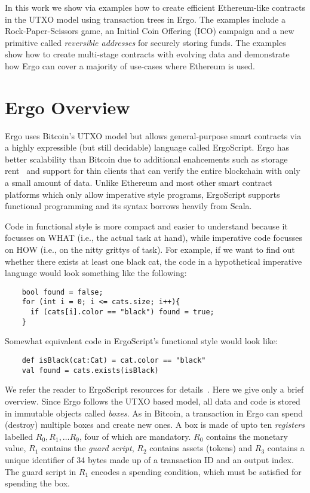 \documentclass[runningheads]{llncs}
\newcommand{\langname}{ErgoScript\xspace}
\begin{document}
In this work we show via examples how to create efficient Ethereum-like contracts in the UTXO model using transaction trees in Ergo. 
The examples include a Rock-Paper-Scissors game, an Initial Coin Offering (ICO) campaign and a new primitive called {\em reversible addresses} for securely storing funds. The examples show how to create multi-stage contracts with evolving data and demonstrate how Ergo can cover a majority of use-cases where Ethereum is used.  


\section{Ergo Overview}
\label{ergo-overview}

Ergo uses Bitcoin's UTXO model but allows general-purpose smart contracts via a highly expressible (but still decidable) language called \langname. Ergo has better scalability than Bitcoin due to additional enahcements such as storage rent~\cite{chepurnoy2018systematic} and support for thin clients that can verify the entire blockchain with only a small amount of data. Unlike Ethereum and most other smart contract platforms which only allow imperative style programs, \langname supports functional programming and its syntax borrows heavily from Scala. 

Code in functional style is more compact and easier to understand because it focusses on WHAT (i.e., the actual task at hand), while imperative code focusses on HOW (i.e., on the nitty grittys of task). For example, if we want to find out whether there exists at least one black cat, the code in a hypothetical imperative language would look something like the following:
\begin{verbatim}
    bool found = false;
    for (int i = 0; i <= cats.size; i++){
      if (cats[i].color == "black") found = true; 
    }
\end{verbatim}

Somewhat equivalent code in \langname's functional style would look like:

\begin{verbatim}
    def isBlack(cat:Cat) = cat.color == "black"
    val found = cats.exists(isBlack)
\end{verbatim}

We refer the reader to \langname resources for details~\cite{langrepo,tutorial,advtutorial}. Here we give only a brief overview.
Since Ergo follows the UTXO based model, all data and code is stored in immutable objects called {\em boxes}. As in Bitcoin, a transaction in Ergo can spend (destroy) multiple boxes and create new ones. 
A box is made of upto ten {\em registers} labelled $R_0, R_1,\ldots R_9$, four of which are mandatory. $R_0$ contains the monetary value, $R_1$ contains the {\em guard script}, $R_2$ contains assets (tokens) and $R_3$ contains a unique identifier of 34 bytes made up of a transaction ID and an output index. The guard script in $R_1$ encodes a spending condition, which must be satisfied for spending the box. 
\end{document}
